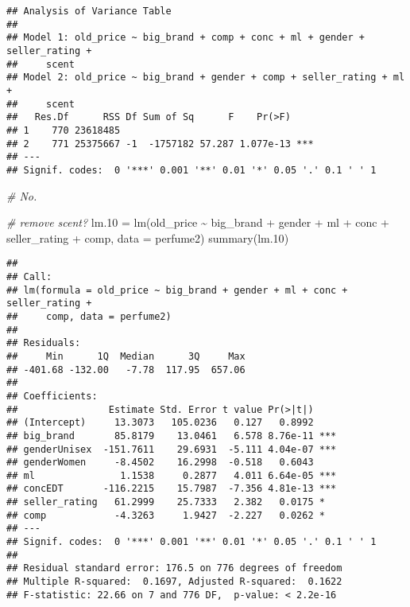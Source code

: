 \documentclass[
]{article}
\newenvironment{Shaded}{\begin{snugshade}}{\end{snugshade}}
\newcommand{\AttributeTok}[1]{\textcolor[rgb]{0.77,0.63,0.00}{#1}}
\newcommand{\CommentTok}[1]{\textcolor[rgb]{0.56,0.35,0.01}{\textit{#1}}}
\newcommand{\FloatTok}[1]{\textcolor[rgb]{0.00,0.00,0.81}{#1}}
\newcommand{\FunctionTok}[1]{\textcolor[rgb]{0.00,0.00,0.00}{#1}}
\newcommand{\NormalTok}[1]{#1}
\newcommand{\OtherTok}[1]{\textcolor[rgb]{0.56,0.35,0.01}{#1}}
\newcommand{\SpecialCharTok}[1]{\textcolor[rgb]{0.00,0.00,0.00}{#1}}
\begin{document}
\begin{verbatim}
## Analysis of Variance Table
## 
## Model 1: old_price ~ big_brand + comp + conc + ml + gender + seller_rating + 
##     scent
## Model 2: old_price ~ big_brand + gender + comp + seller_rating + ml + 
##     scent
##   Res.Df      RSS Df Sum of Sq      F    Pr(>F)    
## 1    770 23618485                                  
## 2    771 25375667 -1  -1757182 57.287 1.077e-13 ***
## ---
## Signif. codes:  0 '***' 0.001 '**' 0.01 '*' 0.05 '.' 0.1 ' ' 1
\end{verbatim}

\begin{Shaded}
\begin{Highlighting}[]
\CommentTok{\# No.}
\end{Highlighting}
\end{Shaded}

\begin{Shaded}
\begin{Highlighting}[]
\CommentTok{\# remove scent?}
\NormalTok{lm}\FloatTok{.10} \OtherTok{=} \FunctionTok{lm}\NormalTok{(old\_price }\SpecialCharTok{\textasciitilde{}}\NormalTok{ big\_brand }\SpecialCharTok{+}\NormalTok{ gender }\SpecialCharTok{+}\NormalTok{ ml }\SpecialCharTok{+}\NormalTok{ conc }\SpecialCharTok{+}\NormalTok{ seller\_rating }\SpecialCharTok{+}\NormalTok{ comp, }\AttributeTok{data =}\NormalTok{ perfume2)}
\FunctionTok{summary}\NormalTok{(lm}\FloatTok{.10}\NormalTok{)}
\end{Highlighting}
\end{Shaded}

\begin{verbatim}
## 
## Call:
## lm(formula = old_price ~ big_brand + gender + ml + conc + seller_rating + 
##     comp, data = perfume2)
## 
## Residuals:
##     Min      1Q  Median      3Q     Max 
## -401.68 -132.00   -7.78  117.95  657.06 
## 
## Coefficients:
##                Estimate Std. Error t value Pr(>|t|)    
## (Intercept)     13.3073   105.0236   0.127   0.8992    
## big_brand       85.8179    13.0461   6.578 8.76e-11 ***
## genderUnisex  -151.7611    29.6931  -5.111 4.04e-07 ***
## genderWomen     -8.4502    16.2998  -0.518   0.6043    
## ml               1.1538     0.2877   4.011 6.64e-05 ***
## concEDT       -116.2215    15.7987  -7.356 4.81e-13 ***
## seller_rating   61.2999    25.7333   2.382   0.0175 *  
## comp            -4.3263     1.9427  -2.227   0.0262 *  
## ---
## Signif. codes:  0 '***' 0.001 '**' 0.01 '*' 0.05 '.' 0.1 ' ' 1
## 
## Residual standard error: 176.5 on 776 degrees of freedom
## Multiple R-squared:  0.1697, Adjusted R-squared:  0.1622 
## F-statistic: 22.66 on 7 and 776 DF,  p-value: < 2.2e-16
\end{verbatim}
\end{document}
